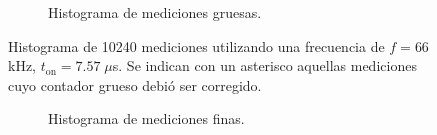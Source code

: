 \begin{figure}[H]
\begin{subfigure}[t]{0.45\textwidth}
{           }
           \caption{Histograma de mediciones gruesas.}
     \end{subfigure}
     \caption{Histograma de 10240 mediciones utilizando una frecuencia de $f=66$ kHz, $t_{\text{on}}=7.57 \; \mu$s. 
     Se indican con un asterisco aquellas mediciones cuyo contador grueso debió ser corregido.}
\end{figure}

\begin{figure}[H]
     \centering
     \begin{subfigure}[t]{0.45\textwidth} %
           \centering
           \caption{Histograma de mediciones finas.}
           \label{fig: histograma_66}
     \end{subfigure}%
     \hspace{10pt}%
     \begin{subfigure}[t]{0.45\textwidth} %
           \centering
\end{subfigure}
\end{figure}
